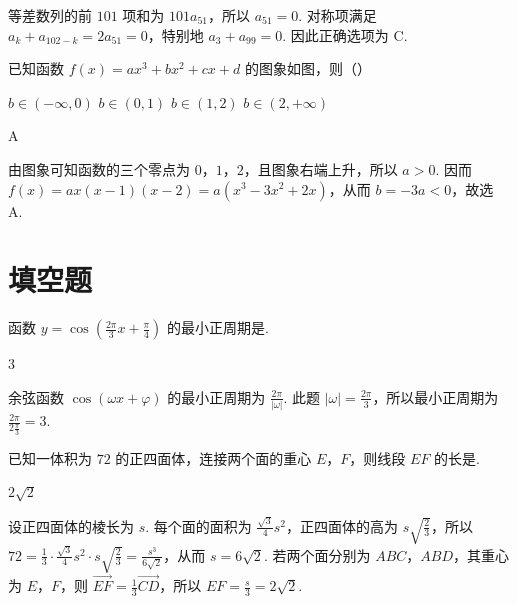 \begin{solution}
等差数列的前 \(101\) 项和为 \(101a_{51}\)，所以 \(a_{51}=0\). 对称项满足 \(a_k+a_{102-k}=2a_{51}=0\)，特别地 \(a_{3}+a_{99}=0\). 因此正确选项为 C.
\end{solution}

\begin{problem}
已知函数 \(f(x)=ax^{3}+bx^{2}+cx+d\) 的图象如图，则（\quad）

\FloatBarrier

\choices
    {\(b\in(-\infty,0)\)}
    {\(b\in(0,1)\)}
    {\(b\in(1,2)\)}
    {\(b\in(2,+\infty)\)}
\end{problem}

\begin{answer}
A
\end{answer}

\begin{solution}
由图象可知函数的三个零点为 \(0\)，\(1\)，\(2\)，且图象右端上升，所以 \(a>0\). 因而 \(f(x)=a x(x-1)(x-2)=a(x^{3}-3x^{2}+2x)\)，从而 \(b=-3a<0\)，故选 A.
\end{solution}

\section{填空题}
\begin{problem}
函数 \(y=\cos\left(\frac{2\pi}{3}x+\frac{\pi}{4}\right)\) 的最小正周期是\fillinblank{}.
\end{problem}

\begin{answer}
\(3\)
\end{answer}

\begin{solution}
余弦函数 \(\cos(\omega x+\varphi)\) 的最小正周期为 \(\frac{2\pi}{|\omega|}\). 此题 \(|\omega|=\frac{2\pi}{3}\)，所以最小正周期为 \(\frac{2\pi}{2\frac{\pi}{3}}=3\).
\end{solution}

\begin{problem}
已知一体积为 \(72\) 的正四面体，连接两个面的重心 \(E\)，\(F\)，则线段 \(EF\) 的长是\fillinblank{}.
\end{problem}

\begin{answer}
\(2\sqrt{2}\)
\end{answer}

\begin{solution}
设正四面体的棱长为 \(s\). 每个面的面积为 \(\frac{\sqrt{3}}{4}s^{2}\)，正四面体的高为 \(s\sqrt{\frac{2}{3}}\)，所以 \(72=\frac{1}{3}\cdot\frac{\sqrt{3}}{4}s^{2}\cdot s\sqrt{\frac{2}{3}}=\frac{s^{3}}{6\sqrt{2}}\)，从而 \(s=6\sqrt{2}\). 若两个面分别为 \(ABC\)，\(ABD\)，其重心为 \(E\)，\(F\)，则 \(\overrightarrow{EF}=\frac{1}{3}\overrightarrow{CD}\)，所以 \(EF=\frac{s}{3}=2\sqrt{2}\).
\end{solution}

